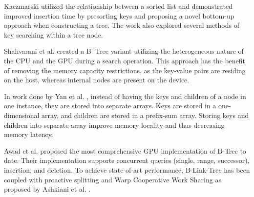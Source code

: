 Kaczmarski \cite{kaczmarski} utilized the relationship between a sorted list and demonstrated improved insertion time by presorting keys and proposing a novel bottom-up approach when constructing a tree. The work also explored several methods of key searching within a tree node.

Shahvarani et al. \cite{hb+tree} created a B$^+$Tree variant utilizing the heterogeneous nature of the CPU and the GPU during a search operation. This approach has the benefit of removing the memory capacity restrictions, as the key-value pairs are residing on the host, whereas internal nodes are present on the device.

In work done by Yan et al. \cite{harmonia}, instead of having the keys and children of a node in one instance, they are stored into separate arrays. Keys are stored in a one-dimensional array, and children are stored in a prefix-sum array. Storing keys and children into separate array improve memory locality and thus decreasing memory latency.

Awad et al. \cite{awad} proposed the most comprehensive GPU implementation of B-Tree to date. Their implementation supports concurrent queries (single, range, successor), insertion, and deletion. To achieve state-of-art performance, B-Link-Tree has been coupled with proactive splitting and Warp Cooperative Work Sharing as proposed by Ashkiani et al. \cite{ashkiani2018dynamic}.

